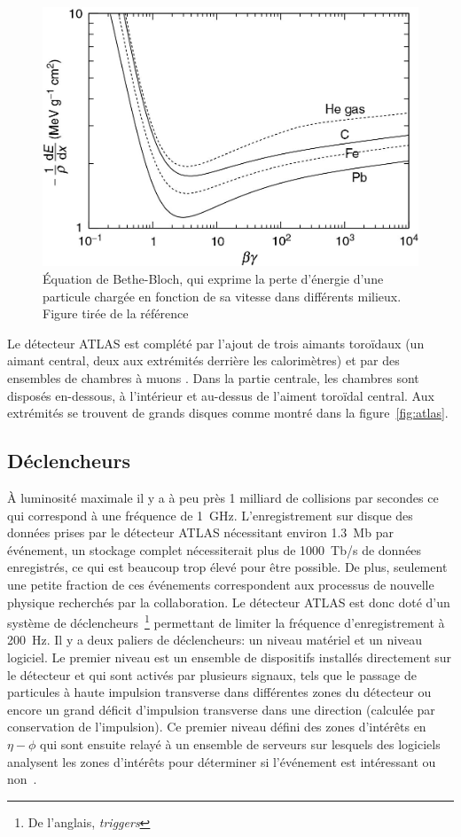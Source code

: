 \begin{figure}
  \centering
  \includegraphics{bethe_bloch.jpg}
  \caption{Équation de Bethe-Bloch, qui exprime la perte d'énergie
    d'une particule chargée en fonction de sa vitesse dans différents
    milieux. Figure tirée de la référence~\cite{thomson_modern_2013}}
  \label{fig:bethe-bloch}
\end{figure}

Le détecteur ATLAS est complété par l'ajout de trois aimants toroïdaux
(un aimant central, deux aux extrémités derrière les calorimètres) et
par des ensembles de chambres à muons . Dans la partie centrale, les
chambres sont disposés en-dessous, à l'intérieur et au-dessus de
l'aiment toroïdal central. Aux extrémités se trouvent de grands
disques comme montré dans la figure~\ref{fig:atlas}.

\subsection{Déclencheurs}
\label{sec:lhc_atlas:atlas:daq}

À luminosité maximale il y a à peu près 1 milliard de collisions par
secondes ce qui correspond à une fréquence de 1~GHz. L'enregistrement
sur disque des données prises par le détecteur ATLAS nécessitant
environ 1.3~Mb par événement, un stockage complet nécessiterait plus
de 1000~Tb/s de données enregistrés, ce qui est beaucoup trop élevé
pour être possible. De plus, seulement une petite fraction de ces
événements correspondent aux processus de nouvelle physique recherchés
par la collaboration. Le détecteur ATLAS est donc doté d'un système de
déclencheurs~\footnote{De l'anglais, \emph{triggers}} permettant de
limiter la fréquence d'enregistrement à 200~Hz. Il y a deux paliers de
déclencheurs: un niveau matériel et un niveau logiciel. Le premier
niveau est un ensemble de dispositifs installés directement sur le
détecteur et qui sont activés par plusieurs signaux, tels que le
passage de particules à haute impulsion transverse dans différentes
zones du détecteur ou encore un grand déficit d'impulsion transverse
dans une direction (calculée par conservation de l'impulsion). Ce
premier niveau défini des zones d'intérêts en $\eta-\phi$ qui sont
ensuite relayé à un ensemble de serveurs sur lesquels des logiciels
analysent les zones d'intérêts pour déterminer si l'événement est
intéressant ou non~\cite{collaboration_atlas_2008}.

